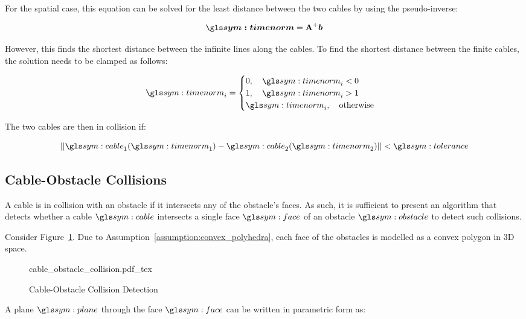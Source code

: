 		For the spatial case, this equation can be solved for the least distance
		between the two cables by using the pseudo-inverse:

		\begin{equation}
			\vec{\timenorm} = \pseudoinv{\mat{A}}\vec{b}
		\end{equation}

		However, this finds the shortest distance between the infinite lines
		along the cables. To find the shortest distance between the finite
		cables, the solution needs to be clamped as follows:

		\begin{equation}
			\timenorm_i =
			\begin{cases}
				0, \quad \timenorm_i < 0 \\
				1, \quad \timenorm_i > 1 \\
				\timenorm_i, \quad \text{otherwise}
			\end{cases}
		\end{equation}

		The two cables are then in collision if:

		\begin{equation}
			\norm{\cable_1(\timenorm_1) - \cable_2(\timenorm_2)} < \tol
		\end{equation}

	\subsection{Cable-Obstacle Collisions}

		A cable is in collision with an obstacle if it intersects any of the
		obstacle's faces. As such, it is sufficient to present an algorithm that
		detects whether a cable $\cable$ intersects a single face $\face$ of an
		obstacle $\obstacle$ to detect such collisions.

		Consider Figure~\ref{fig:cable_obstacle_collision_detection}. Due to
		Assumption~\ref{assumption:convex_polyhedra}, each face of the obstacles
		is modelled as a convex polygon in 3D space.

		\begin{figure}[hbt]
			\centering
			\def\svgwidth{\columnwidth}
			{cable_obstacle_collision.pdf_tex}
			\caption{Cable-Obstacle Collision Detection}%
			\label{fig:cable_obstacle_collision_detection}
		\end{figure}

		A plane $\plane$ through the face $\face$ can be written in parametric
		form as:

